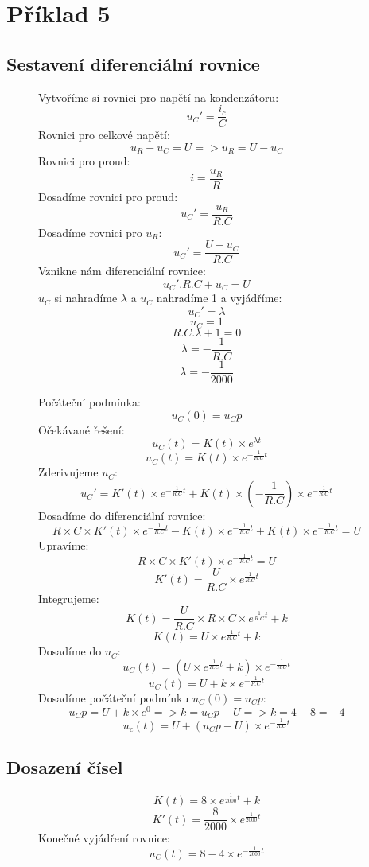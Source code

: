 \section{Příklad 5}

\subsection{Sestavení diferenciální rovnice}
\begin{figure}[H]
Vytvoříme si rovnici pro napětí na kondenzátoru: $$u_C' = \frac{i_c}{C}$$
Rovnici pro celkové napětí: $$u_R + u_C = U =>u_R = U - u_C$$
Rovnici pro proud: $$i = \frac{u_R}{R}$$
Dosadíme rovnici pro proud: $$u_C' = \frac{u_R}{R.C}$$
Dosadíme rovnici pro $u_R$: $$u_C' = \frac{U - u_C}{R.C}$$
Vznikne nám diferenciální rovnice: $$u_C'.R.C + u_C = U$$
$u_C$ si nahradíme $\lambda$ a $u_C$ nahradíme 1 a vyjádříme:
$$u_C' = \lambda$$ $$u_C = 1$$ $$R.C.\lambda + 1 = 0$$ $$\lambda = -\frac{1}{R.C}$$ $$\lambda = -\frac{1}{2000}$$
\end{figure}

\begin{figure}[H]
Počáteční podmínka: $$u_C(0) = u_Cp$$
Očekávané řešení: $$u_C(t) = K(t)\times e^{\lambda t}$$ $$u_C(t) = K(t)\times e^{-\frac{1}{R.C}t}$$
Zderivujeme $u_C$: $$u_C' = K'(t)\times e^{-\frac{1}{R.C}t} + K(t) \times (-\frac{1}{R.C})\times e^{-\frac{1}{R.C}t}$$
Dosadíme do diferenciální rovnice: $$R\times C\times K'(t)\times e^{-\frac{1}{R.C}t} - K(t)\times e^{-\frac{1}{R.C}t} + K(t) \times e^{-\frac{1}{R.C}t} = U$$
Upravíme: $$R\times C \times K'(t) \times e^{-\frac{1}{R.C}t} = U$$
$$K'(t) = \frac{U}{R.C}\times e^{\frac{1}{R.C}t}$$
Integrujeme: $$K(t) = \frac{U}{R.C} \times R\times C \times e^{\frac{1}{R.C}t} + k$$
$$K(t) = U\times e^{\frac{1}{R.C}t} + k$$
Dosadíme do $u_C$: $$u_C(t) = (U \times e^{\frac{1}{R.C}t} + k) \times e^{-\frac{1}{R.C}t}$$
$$u_C(t) = U + k\times e^{-\frac{1}{R.C}t}$$
Dosadíme počáteční podmínku $u_C(0) = u_Cp$:
$$u_Cp = U + k\times e^0 => k = u_Cp - U => k = 4 - 8 = -4$$
$$u_c(t) = U + (u_Cp - U) \times e^{-\frac{1}{R.C}t}$$
\end{figure}

\subsection{Dosazení čísel}
\begin{figure}[H]
$$K(t) = 8\times e^{\frac{1}{2000}t} + k$$
$$K'(t) = \frac{8}{2000} \times e^{\frac{1}{2000}t}$$
Konečné vyjádření rovnice: $$u_C(t) = 8 - 4\times e^{-\frac{1}{2000}t}$$
\end{figure}

